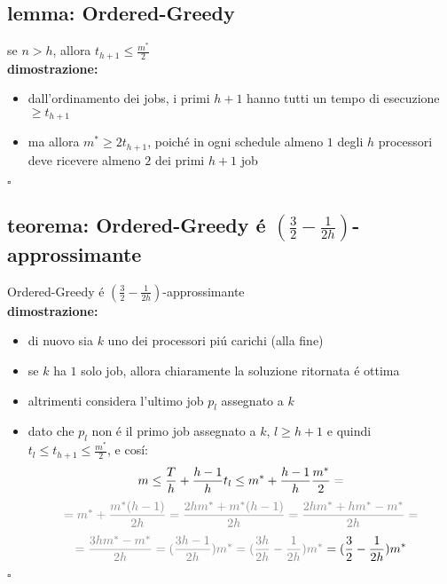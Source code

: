 
\subsection*{lemma: Ordered-Greedy}
\begin{flushleft}
	se $n>h$, allora $t_{h+1}\leq\frac{m^*}{2}$ \newline \\
	\vspace{0.5cm}
	\textbf{dimostrazione:}
	\begin{itemize}
		\item dall'ordinamento dei jobs, i primi $h+1$ hanno tutti un tempo di esecuzione $\geq t_{h+1}$
		\item ma allora $m^*\geq 2 t_{h+1}$, poich\'e in ogni schedule almeno $1$ degli $h$ processori deve ricevere almeno $2$ dei primi $h+1$ job
	\end{itemize}
	\hfill$\square$
\end{flushleft}


\subsection*{teorema: Ordered-Greedy \'e $(\frac{3}{2}-\frac{1}{2h})$-approssimante}
\begin{flushleft}
	Ordered-Greedy \'e $(\frac{3}{2}-\frac{1}{2h})$-approssimante \newline \\
	\vspace{0.5cm}
	\textbf{dimostrazione:}
	\begin{itemize}
		\item di nuovo sia $k$ uno dei processori pi\'u carichi (alla fine)
		\item se $k$ ha $1$ solo job, allora chiaramente la soluzione ritornata \'e ottima
		\item altrimenti considera l'ultimo job $p_l$ assegnato a $k$
		\item dato che $p_l$ non \'e il primo job assegnato a $k$, $l\geq h+1$ e quindi $t_l\leq t_{h+1}\leq\frac{m^*}{2}$, e cos\'i:
			$$m\leq\frac{T}{h}+\frac{h-1}{h}t_l\leq m^*+\frac{h-1}{h}\frac{m^*}{2}\color{gray}=$$
			$$\color{gray}=m^*+\frac{m^*(h-1)}{2h}=\frac{2hm^*+m^*(h-1)}{2h}=\frac{2hm^*+hm^*-m^*}{2h}=$$
			$$\color{gray}=\frac{3hm^*-m^*}{2h}=(\frac{3h-1}{2h})m^*=(\frac{3h}{2h}-\frac{1}{2h})m^*\color{black}=(\frac{3}{2}-\frac{1}{2h})m^*$$
	\end{itemize}
	\hfill$\square$
\end{flushleft}

